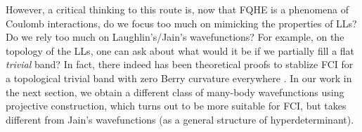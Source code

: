 However, a critical thinking to this route is, now that FQHE is a phenomena of Coulomb interactions, do we focus too much on mimicking the properties of LLs? Do we rely too much on Laughlin's/Jain's wavefunctions? For example, on the topology of the LLs, one can ask about what would it be if we partially fill a flat \emph{trivial} band? In fact, there indeed has been theoretical proofs to stablize FCI for a topological trivial band with zero Berry curvature everywhere \cite{simon2015fractional}. In our work in the next section, we obtain a different class of many-body wavefunctions using projective construction, which turns out to be more suitable for FCI, but takes different from Jain's wavefunctions (as a general structure of hyperdeterminant).



